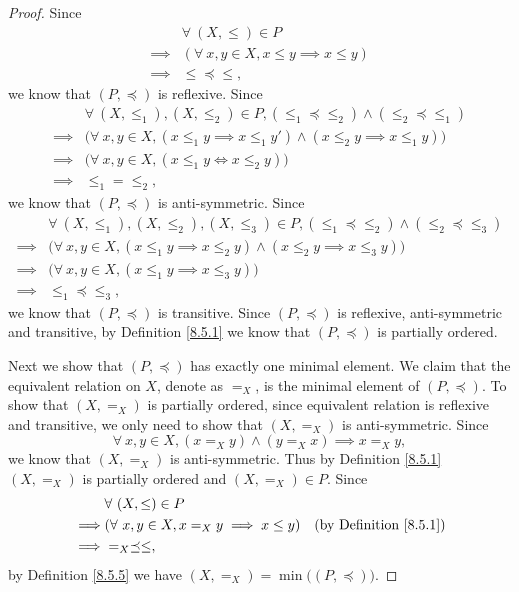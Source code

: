 \begin{proof}
    Since
    \begin{align*}
                 & \forall\ (X, \leq) \in P                          \\
        \implies & (\forall\ x, y \in X, x \leq y \implies x \leq y) \\
        \implies & \leq \preceq \leq,
    \end{align*}
    we know that \((P, \preceq)\) is reflexive.
    Since
    \begin{align*}
                 & \forall\ (X, \leq_1), (X, \leq_2) \in P, (\leq_1 \preceq \leq_2) \land (\leq_2 \preceq \leq_1)          \\
        \implies & \big(\forall\ x, y \in X, (x \leq_1 y \implies x \leq_1 y') \land (x \leq_2 y \implies x \leq_1 y)\big) \\
        \implies & \big(\forall\ x, y \in X, (x \leq_1 y \iff x \leq_2 y)\big)                                             \\
        \implies & \leq_1 = \leq_2,
    \end{align*}
    we know that \((P, \preceq)\) is anti-symmetric.
    Since
    \begin{align*}
                 & \forall\ (X, \leq_1), (X, \leq_2), (X, \leq_3) \in P, (\leq_1 \preceq \leq_2) \land (\leq_2 \preceq \leq_3) \\
        \implies & \big(\forall\ x, y \in X, (x \leq_1 y \implies x \leq_2 y) \land (x \leq_2 y \implies x \leq_3 y)\big)      \\
        \implies & \big(\forall\ x, y \in X, (x \leq_1 y \implies x \leq_3 y)\big)                                             \\
        \implies & \leq_1 \preceq \leq_3,
    \end{align*}
    we know that \((P, \preceq)\) is transitive.
    Since \((P, \preceq)\) is reflexive, anti-symmetric and transitive, by Definition \ref{8.5.1} we know that \((P, \preceq)\) is partially ordered.

    Next we show that \((P, \preceq)\) has exactly one minimal element.
    We claim that the equivalent relation on \(X\), denote as \(=_X\), is the minimal element of \((P, \preceq)\).
    To show that \((X, =_X)\) is partially ordered, since equivalent relation is reflexive and transitive, we only need to show that \((X, =_X)\) is anti-symmetric.
    Since
    \[
        \forall\ x, y \in X, (x =_X y) \land (y =_X x) \implies x =_X y,
    \]
    we know that \((X, =_X)\) is anti-symmetric.
    Thus by Definition \ref{8.5.1} \((X, =_X)\) is partially ordered and \((X, =_X) \in P\).
    Since
    \begin{align*}
                 & \forall\ (X, \leq) \in P                                                              \\
        \implies & (\forall\ x, y \in X, x =_X y \implies x \leq y) & \text{(by Definition \ref{8.5.1})} \\
        \implies & =_X \preceq \leq,
    \end{align*}
    by Definition \ref{8.5.5} we have \((X, =_X) = \min\big((P, \preceq)\big)\).


\end{proof}
